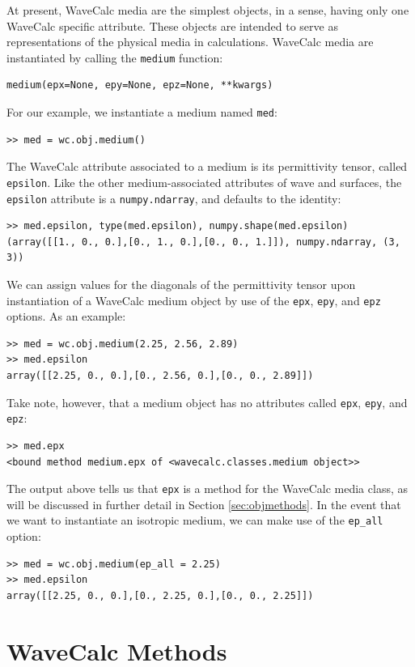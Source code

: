 \documentclass[11pt, reqno]{book}%
\newcounter{ct}
\newcommand{\tw}[1]{{\tt #1}}
\begin{document}
At present, WaveCalc media are the simplest objects, in a sense, having only one WaveCalc specific attribute. These objects are intended to serve as representations of the physical media in calculations. WaveCalc media are instantiated by calling the \tw{medium} function:
\begin{verbatim}
medium(epx=None, epy=None, epz=None, **kwargs)
\end{verbatim}
\noindent For our example, we instantiate a medium named \tw{med}:
\begin{verbatim}
>> med = wc.obj.medium()
\end{verbatim}
\noindent The WaveCalc attribute associated to a medium is its permittivity tensor, called \tw{epsilon}. Like the other medium-associated attributes of wave and surfaces, the \tw{epsilon} attribute is a \tw{numpy.ndarray}, and defaults to the identity:
\begin{verbatim}
>> med.epsilon, type(med.epsilon), numpy.shape(med.epsilon)
(array([[1., 0., 0.],[0., 1., 0.],[0., 0., 1.]]), numpy.ndarray, (3, 3))
\end{verbatim}
\noindent We can assign values for the diagonals of the permittivity tensor upon instantiation of a WaveCalc medium object by use of the \tw{epx}, \tw{epy}, and \tw{epz} options. As an example:
\begin{verbatim}
>> med = wc.obj.medium(2.25, 2.56, 2.89)
>> med.epsilon
array([[2.25, 0., 0.],[0., 2.56, 0.],[0., 0., 2.89]])
\end{verbatim}
\noindent Take note, however, that a medium object has no attributes called \tw{epx}, \tw{epy}, and \tw{epz}:
\begin{verbatim}
>> med.epx
<bound method medium.epx of <wavecalc.classes.medium object>>
\end{verbatim}
\noindent The output above tells us that \tw{epx} is a method for the WaveCalc media class, as will be discussed in further detail in Section \ref{sec:objmethods}. In the event that we want to instantiate an isotropic medium, we can make use of the \tw{ep\_all} option:
\begin{verbatim}
>> med = wc.obj.medium(ep_all = 2.25)
>> med.epsilon
array([[2.25, 0., 0.],[0., 2.25, 0.],[0., 0., 2.25]])
\end{verbatim}



\chapter{WaveCalc Methods}
\label{chap:methods}
\end{document}
